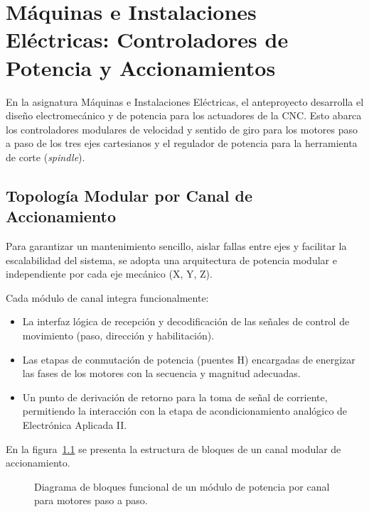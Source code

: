 \chapter{Máquinas e Instalaciones Eléctricas: Controladores de Potencia y Accionamientos}
\label{sec:maquinas_e_instalaciones_electricas}

En la asignatura Máquinas e Instalaciones Eléctricas, el anteproyecto desarrolla el diseño electromecánico y de
potencia para los actuadores de la CNC. Esto abarca los controladores modulares de velocidad y sentido de giro para
los motores paso a paso de los tres ejes cartesianos y el regulador de potencia para la herramienta de corte (\textit{spindle}).

\section{Topología Modular por Canal de Accionamiento}
\label{sec:myie_modularidad}

Para garantizar un mantenimiento sencillo, aislar fallas entre ejes y facilitar la escalabilidad del sistema, se adopta
una arquitectura de potencia modular e independiente por cada eje mecánico (X, Y, Z).

Cada módulo de canal integra funcionalmente:
\begin{itemize}
  \item La interfaz lógica de recepción y decodificación de las señales de control de movimiento (paso, dirección y
    habilitación).
  \item Las etapas de conmutación de potencia (puentes H) encargadas de energizar las fases de los motores con la
    secuencia y magnitud adecuadas.
  \item Un punto de derivación de retorno para la toma de señal de corriente, permitiendo la interacción con la etapa
    de acondicionamiento analógico de Electrónica Aplicada II.
\end{itemize}

En la figura~\ref{crkt.ej4:driver_paso_a_paso} se presenta la estructura de bloques de un canal modular de accionamiento.

\begin{figure}[!ht]
  \centering
  \resizebox{0.95\linewidth}{!}{}
  \caption{Diagrama de bloques funcional de un módulo de potencia por canal para motores paso a paso.}
  \label{crkt.ej4:driver_paso_a_paso}
\end{figure}

